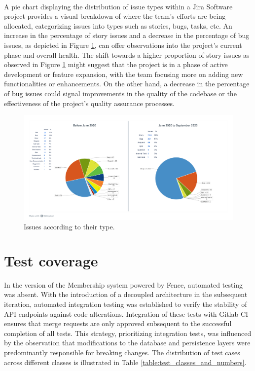 \paragraph{} A pie chart displaying the distribution of issue types within a Jira Software project provides a visual breakdown of where the team's efforts are being allocated, categorizing issues into types such as stories, bugs, tasks, etc. An increase in the percentage of story issues and a decrease in the percentage of bug issues, as depicted in Figure \ref{fig:pie_jira}, can offer observations into the project's current phase and overall health. The shift towards a higher proportion of story issues as observed in Figure \ref{fig:pie_jira} might suggest that the project is in a phase of active development or feature expansion, with the team focusing more on adding new functionalities or enhancements. On the other hand, a decrease in the percentage of bug issues could signal improvements in the quality of the codebase or the effectiveness of the project's quality assurance processes.

\begin{figure} [H]
    \centering
    \includegraphics[width=1\linewidth]{figuras/pie_jira_2.png}
    \caption{Issues according to their type.}
    \label{fig:pie_jira}
\end{figure}






\section{Test coverage}
\paragraph{} In the version of the Membership system powered by Fence, automated testing was absent. With the introduction of a decoupled architecture in the subsequent iteration, automated integration testing was established to verify the stability of API endpoints against code alterations. Integration of these tests with Gitlab CI ensures that merge requests are only approved subsequent to the successful completion of all tests. This strategy, prioritizing integration tests, was influenced by the observation that modifications to the database and persistence layers were predominantly responsible for breaking changes. The distribution of test cases across different classes is illustrated in Table \ref{table:test_classes_and_numbers}.




